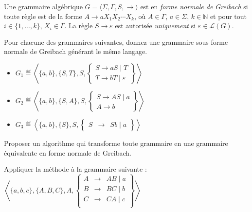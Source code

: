 
\begingroup

\begin{exercice}\label{exo:parsing/CYK/challenge}

  Une grammaire algébrique $G=\langle \Sigma, \Gamma, S, \rightarrow \rangle$ est en \emph{forme normale de Greibach} si toute règle est de la forme
  $A \rightarrow a X_1 X_2 \cdots X_k$, où $A \in \Gamma$, $a \in \Sigma$, $k\in \mathbb{N}$ et pour tout $i\in \{1, ..., k\}$, $X_i \in \Gamma$. 
  La règle $S\rightarrow \varepsilon$ est autorisée \emph{uniquement} si $\varepsilon\in \mathcal{L}(G)$.

  \begin{questions}

  \item Pour chacune des grammaires suivantes, donnez une grammaire sous forme normale de Greibach générant le même langage. 
    \begin{itemize}

    \item $G_1 \eqdef \left\langle \{a,b\}, \{S,T\}, S,
      \left\{\begin{array}{l}
      S \rightarrow a S \mid T\\
      T \rightarrow bT \mid \varepsilon
      \end{array}\right\}\right\rangle$

    \item $G_2 \eqdef \left\langle \{a,b\}, \{S,A\}, S,
      \left\{\begin{array}{l}
      S \rightarrow A S \mid a\\
      A \rightarrow b
      \end{array}\right\}\right\rangle$

    \item $G_3 \eqdef \left\langle \{a,b\}, \{S\}, S,
      \left\{\begin{array}{rcl}
      S &\rightarrow& S b \mid a
      \end{array}\right\}\right\rangle$


    \end{itemize}
    
  \item Proposer un algorithme qui transforme toute grammaire en une grammaire
    équivalente en forme normale de Greibach.

  \item Appliquer la méthode à la grammaire suivante : 
    $\left\langle \{a,b,c\}, \{A,B,C\}, A,
    \left\{\begin{array}{rcl}
    A & \rightarrow & AB\mid a\\
    B & \rightarrow & BC\mid b\\
    C & \rightarrow & CA\mid c\\
    \end{array}\right\}\right\rangle$

  \end{questions}

\end{exercice}


